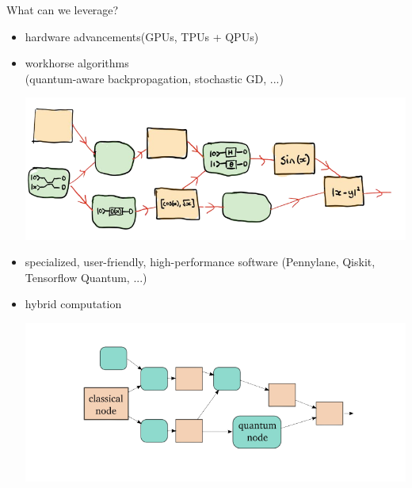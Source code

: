 \begin{frame}{What can we leverage?}
	\begin{itemize}
		\item hardware advancements(GPUs, TPUs + \alert{QPUs})
		\item 
		workhorse algorithms\\ (\alert{quantum-aware} backpropagation, stochastic GD, ...)
		\begin{center}
		  \includegraphics[width=.6\linewidth]{qbackprop}
		\end{center}	
		
		\item specialized, user-friendly, high-performance software (Pennylane, Qiskit, Tensorflow Quantum, ...)
		
		\item 
		\begin{minipage}[c]{0.3\textwidth}
			\alert{hybrid} computation
		\end{minipage}
		\begin{minipage}[c]{0.6\textwidth}
			\includegraphics[width=\linewidth]{hybrid}
		\end{minipage}
		
	\end{itemize}
\end{frame}